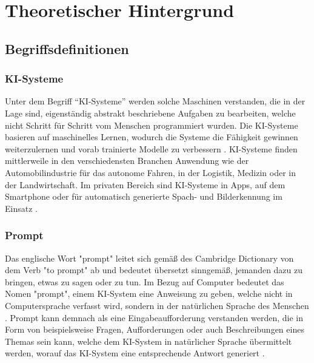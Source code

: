 \chapter{Theoretischer Hintergrund}
\section{Begriffsdefinitionen}

\subsection{KI-Systeme}

Unter dem Begriff “KI-Systeme” werden solche Maschinen verstanden, die in der Lage sind, eigenständig abstrakt beschriebene Aufgaben zu bearbeiten, welche nicht Schritt für Schritt vom Menschen programmiert wurden. Die KI-Systeme basieren auf maschinelles Lernen, wodurch die Systeme die Fähigkeit gewinnen weiterzulernen und vorab trainierte Modelle zu verbessern \autocite{ifaa2023}. KI-Systeme finden mittlerweile in den verschiedensten Branchen Anwendung wie der Automobilindustrie für das autonome Fahren, in der Logistik, Medizin oder in der Landwirtschaft. Im privaten Bereich sind KI-Systeme in Apps, auf dem Smartphone oder für automatisch generierte Spach- und Bilderkennung im Einsatz \autocite[S. 1, S.8]{moring2023}.

\subsection{Prompt}
Das englische Wort "prompt" leitet sich gemäß des Cambridge Dictionary \autocite{cambridge-university-press-assessment-2023} von dem Verb "to prompt" ab und bedeutet übersetzt sinngemäß, jemanden dazu zu bringen, etwas zu sagen oder zu tun. Im Bezug auf Computer bedeutet das Nomen "prompt", einem KI-System eine Anweisung zu geben, welche nicht in Computersprache verfasst wird, sondern in der natürlichen Sprache des Menschen \autocite{cambridge-university-press-assessment-2023}. 
Prompt kann demnach als eine Eingabeaufforderung verstanden werden, die in Form von beispielsweise Fragen, Aufforderungen oder auch Beschreibungen eines Themas sein kann, welche dem KI-System in natürlicher Sprache übermittelt werden, worauf das KI-System eine entsprechende Antwort generiert \autocite{BM-ExpertsGmbH2023}.

